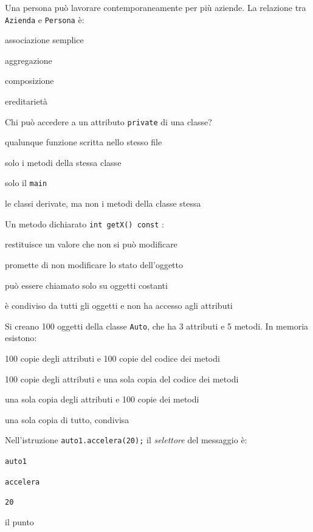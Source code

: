 \begin{quiz}{Una persona può lavorare contemporaneamente per più aziende. La relazione tra \texttt{Azienda} e \texttt{Persona} è:}
  \item associazione semplice
  \item aggregazione
  \item composizione
  \item ereditarietà
\end{quiz}

\begin{quiz}{Chi può accedere a un attributo \texttt{private} di una classe?}
  \item qualunque funzione scritta nello stesso file
  \item solo i metodi della stessa classe
  \item solo il \texttt{main}
  \item le classi derivate, ma non i metodi della classe stessa
\end{quiz}

\begin{quiz}{Un metodo dichiarato \texttt{int getX() const} :}
  \item restituisce un valore che non si può modificare
  \item promette di non modificare lo stato dell'oggetto
  \item può essere chiamato solo su oggetti costanti
  \item è condiviso da tutti gli oggetti e non ha accesso agli attributi
\end{quiz}

\begin{quiz}{Si creano 100 oggetti della classe \texttt{Auto}, che ha 3 attributi e 5 metodi. In memoria esistono:}
  \item 100 copie degli attributi e 100 copie del codice dei metodi
  \item 100 copie degli attributi e una sola copia del codice dei metodi
  \item una sola copia degli attributi e 100 copie dei metodi
  \item una sola copia di tutto, condivisa
\end{quiz}

\begin{quiz}{Nell'istruzione \texttt{auto1.accelera(20);} il \emph{selettore} del messaggio è:}
  \item \texttt{auto1}
  \item \texttt{accelera}
  \item \texttt{20}
  \item il punto
\end{quiz}

